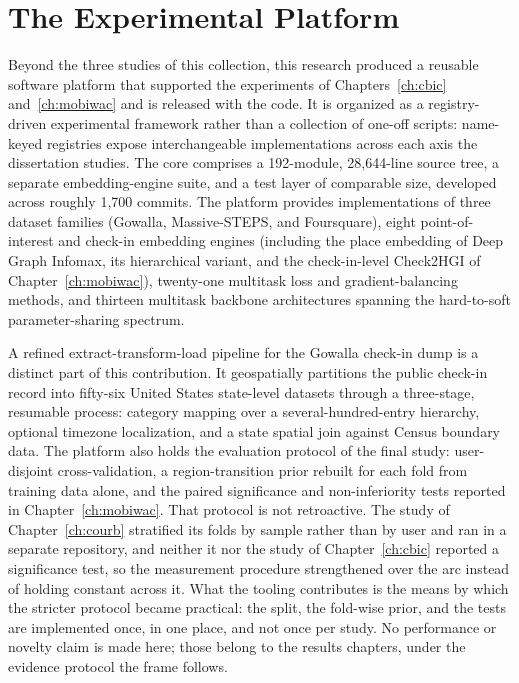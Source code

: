 
\chapter{The Experimental Platform}
\label{apx:contributions:platform}
Beyond the three studies of this collection, this research produced a reusable software
platform that supported the experiments of Chapters~\ref{ch:cbic}
and~\ref{ch:mobiwac} and is released with the code.
It is organized as a registry-driven experimental framework rather than a
collection of one-off scripts: name-keyed registries expose interchangeable
implementations across each axis the dissertation studies. The core comprises a
192-module, 28{,}644-line source tree, a separate embedding-engine suite, and a test
layer of comparable size, developed across roughly 1{,}700 commits. The platform
provides implementations of three dataset families (Gowalla, Massive-STEPS, and
Foursquare), eight point-of-interest and check-in embedding engines (including the
place embedding of Deep Graph Infomax, its hierarchical variant, and the
check-in-level Check2HGI of Chapter~\ref{ch:mobiwac}), twenty-one multitask loss and
gradient-balancing methods, and thirteen multitask backbone architectures spanning
the hard-to-soft parameter-sharing spectrum.

A refined extract-transform-load pipeline for the Gowalla check-in dump is a
distinct part of this contribution. It geospatially partitions the public check-in
record into fifty-six United States state-level datasets through a three-stage,
resumable process: category mapping over a several-hundred-entry hierarchy, optional
timezone localization, and a state spatial join against Census boundary data. The
platform also holds the evaluation protocol of the final study: user-disjoint
cross-validation, a region-transition prior rebuilt for each fold from training data
alone, and the paired significance and non-inferiority tests reported in
Chapter~\ref{ch:mobiwac}. That protocol is not retroactive. The study of
Chapter~\ref{ch:courb} stratified its folds by sample rather than by user and ran in a
separate repository, and neither it nor the study of Chapter~\ref{ch:cbic} reported a
significance test, so the measurement procedure strengthened over the arc instead of
holding constant across it. What the tooling contributes is the means by which the
stricter protocol became practical: the split, the fold-wise prior, and the tests are
implemented once, in one place, and not once per study. No
performance or novelty claim is made here; those belong to the results chapters, under
the evidence protocol the frame follows.
